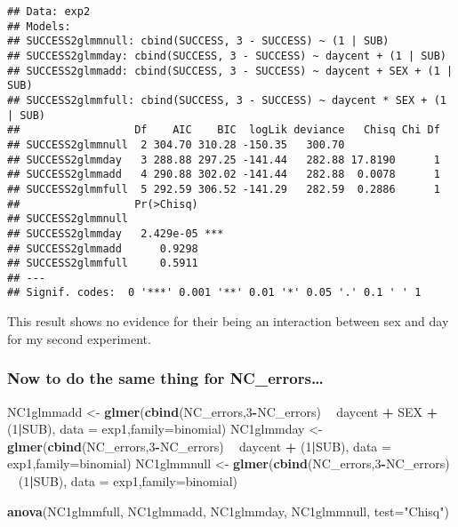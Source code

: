 \documentclass[]{article}
\newenvironment{Shaded}{\begin{snugshade}}{\end{snugshade}}
\newcommand{\KeywordTok}[1]{\textcolor[rgb]{0.13,0.29,0.53}{\textbf{#1}}}
\newcommand{\DataTypeTok}[1]{\textcolor[rgb]{0.13,0.29,0.53}{#1}}
\newcommand{\DecValTok}[1]{\textcolor[rgb]{0.00,0.00,0.81}{#1}}
\newcommand{\StringTok}[1]{\textcolor[rgb]{0.31,0.60,0.02}{#1}}
\newcommand{\OperatorTok}[1]{\textcolor[rgb]{0.81,0.36,0.00}{\textbf{#1}}}
\newcommand{\NormalTok}[1]{#1}
\begin{document}
\begin{verbatim}
## Data: exp2
## Models:
## SUCCESS2glmmnull: cbind(SUCCESS, 3 - SUCCESS) ~ (1 | SUB)
## SUCCESS2glmmday: cbind(SUCCESS, 3 - SUCCESS) ~ daycent + (1 | SUB)
## SUCCESS2glmmadd: cbind(SUCCESS, 3 - SUCCESS) ~ daycent + SEX + (1 | SUB)
## SUCCESS2glmmfull: cbind(SUCCESS, 3 - SUCCESS) ~ daycent * SEX + (1 | SUB)
##                  Df    AIC    BIC  logLik deviance   Chisq Chi Df
## SUCCESS2glmmnull  2 304.70 310.28 -150.35   300.70               
## SUCCESS2glmmday   3 288.88 297.25 -141.44   282.88 17.8190      1
## SUCCESS2glmmadd   4 290.88 302.02 -141.44   282.88  0.0078      1
## SUCCESS2glmmfull  5 292.59 306.52 -141.29   282.59  0.2886      1
##                  Pr(>Chisq)    
## SUCCESS2glmmnull               
## SUCCESS2glmmday   2.429e-05 ***
## SUCCESS2glmmadd      0.9298    
## SUCCESS2glmmfull     0.5911    
## ---
## Signif. codes:  0 '***' 0.001 '**' 0.01 '*' 0.05 '.' 0.1 ' ' 1
\end{verbatim}

This result shows no evidence for their being an interaction between sex
and day for my second experiment.

\subsubsection{Now to do the same thing for
NC\_errors\ldots{}}\label{now-to-do-the-same-thing-for-nc_errors}

\begin{Shaded}
\begin{Highlighting}[]
\NormalTok{NC1glmmadd <-}\StringTok{ }\KeywordTok{glmer}\NormalTok{(}\KeywordTok{cbind}\NormalTok{(NC_errors,}\DecValTok{3}\OperatorTok{-}\NormalTok{NC_errors) }\OperatorTok{~}\StringTok{ }\NormalTok{daycent }\OperatorTok{+}\StringTok{ }\NormalTok{SEX }\OperatorTok{+}\StringTok{ }\NormalTok{(}\DecValTok{1}\OperatorTok{|}\NormalTok{SUB), }\DataTypeTok{data =}\NormalTok{ exp1,}\DataTypeTok{family=}\NormalTok{binomial)}
\NormalTok{NC1glmmday <-}\StringTok{ }\KeywordTok{glmer}\NormalTok{(}\KeywordTok{cbind}\NormalTok{(NC_errors,}\DecValTok{3}\OperatorTok{-}\NormalTok{NC_errors) }\OperatorTok{~}\StringTok{ }\NormalTok{daycent }\OperatorTok{+}\StringTok{ }\NormalTok{(}\DecValTok{1}\OperatorTok{|}\NormalTok{SUB), }\DataTypeTok{data =}\NormalTok{ exp1,}\DataTypeTok{family=}\NormalTok{binomial)}
\NormalTok{NC1glmmnull <-}\StringTok{ }\KeywordTok{glmer}\NormalTok{(}\KeywordTok{cbind}\NormalTok{(NC_errors,}\DecValTok{3}\OperatorTok{-}\NormalTok{NC_errors) }\OperatorTok{~}\StringTok{ }\NormalTok{(}\DecValTok{1}\OperatorTok{|}\NormalTok{SUB), }\DataTypeTok{data =}\NormalTok{ exp1,}\DataTypeTok{family=}\NormalTok{binomial)}

\KeywordTok{anova}\NormalTok{(NC1glmmfull, NC1glmmadd, NC1glmmday, NC1glmmnull, }\DataTypeTok{test=}\StringTok{"Chisq"}\NormalTok{)}
\end{Highlighting}
\end{Shaded}
\end{document}
